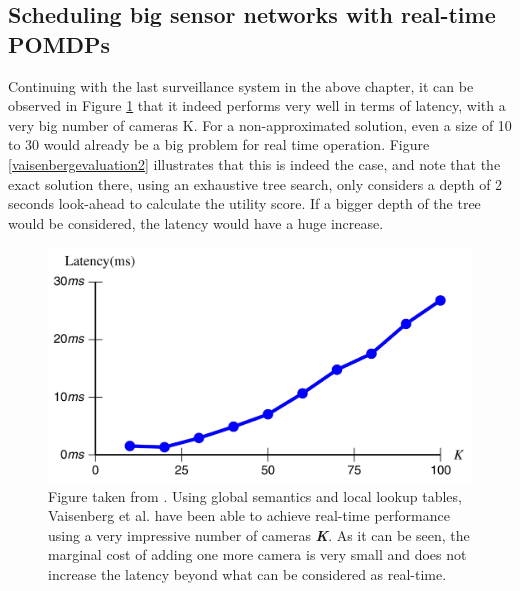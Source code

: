\documentclass[a4paper,11pt,english]{article}
\begin{document}
\subsection{Scheduling big sensor networks with real-time POMDPs}


Continuing with the last surveillance system in the above chapter, it can be observed in Figure \ref{vaisenbergevaluation1} that it indeed performs very well in terms of latency, with a very big number of cameras K. For a non-approximated solution, even a size of 10 to 30 would already be a big problem for real time operation. Figure \ref{vaisenbergevaluation2} illustrates that this is indeed the case, and note that the exact solution there, using an exhaustive tree search, only considers a depth of 2 seconds look-ahead to calculate the utility score. If a bigger depth of the tree would be considered, the latency would have a huge increase.
\begin{figure}[t!]
  
  \centering
    \includegraphics[scale=0.13]{vaisenbergevaluation1_highres.jpg}
    \caption{Figure taken from \cite{vaisenberg2014scheduling}. Using global semantics and local lookup tables, Vaisenberg et al. \cite{vaisenberg2014scheduling} have been able to achieve real-time performance using a very impressive number of cameras \textbf{\textit{K}}. As it can be seen, the marginal cost of adding one more camera is very small and does not increase the latency beyond what can be considered as real-time.}
  \label{vaisenbergevaluation1}
\end{figure}
\end{document}
